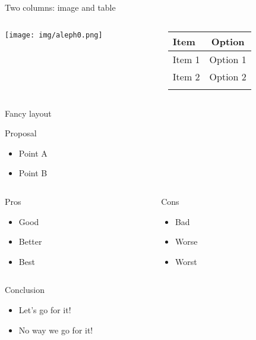 \documentclass[
  11pt,
  ignorenonframetext,
  aspectratio=169]{beamer}
\providecommand{\tightlist}{%
  \setlength{\itemsep}{0pt}\setlength{\parskip}{0pt}}
\begin{document}
\begin{frame}{Two columns: image and table}
\label{two-columns-image-and-table}
\begin{columns}[T]
\begin{column}{0.48\linewidth}
\texttt{[image: img/aleph0.png]}
\end{column}

\begin{column}{0.48\linewidth}
\begin{longtable}[]{@{}lc@{}}
\toprule\noalign{}
\textbf{Item} & \textbf{Option} \\
\midrule\noalign{}
\endhead
Item 1 & Option 1 \\
Item 2 & Option 2 \\
\bottomrule\noalign{}
\end{longtable}
\end{column}
\end{columns}
\end{frame}

\begin{frame}{Fancy layout}
\label{fancy-layout}
\begin{block}{Proposal}
\label{proposal}
\begin{itemize}
\tightlist
\item
  Point A
\item
  Point B
\end{itemize}
\end{block}

\begin{columns}[T]
\begin{column}{0.48\linewidth}
\begin{block}{Pros}
\label{pros}
\begin{itemize}
\tightlist
\item
  Good
\item
  Better
\item
  Best
\end{itemize}
\end{block}
\end{column}

\begin{column}{0.48\linewidth}
\begin{block}{Cons}
\label{cons}
\begin{itemize}
\tightlist
\item
  Bad
\item
  Worse
\item
  Worst
\end{itemize}
\end{block}
\end{column}
\end{columns}

\begin{block}{Conclusion}
\label{conclusion}
\begin{itemize}
\tightlist
\item
  Let's go for it!
\item
  No way we go for it!
\end{itemize}
\end{block}
\end{frame}
\end{document}

